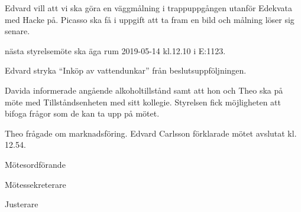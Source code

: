 \documentclass[10pt]{article}
\def\mo{Edvard Carlsson}
\def\ms{Sonja Kenari}
\def\ji{Jakob Pettersson}
\begin{document}
\begin{paragrafer}
Edvard vill att vi ska göra en väggmålning i trappuppgången utanför Edekvata med Hacke på. Picasso ska få i uppgift att ta fram en bild och målning löser sig senare.

\Mba nästa styrelsemöte ska äga rum 2019-05-14 kl.12.10 i E:1123.


Edvard \ypa stryka ``Inköp av vattendunkar'' från beslutsuppföljningen.
\Mbaby

Davida informerade angående alkoholtillstånd samt att hon och Theo ska på möte med Tillståndsenheten med sitt kollegie. Styrelsen fick möjligheten att bifoga frågor som de kan ta upp på mötet.

Theo frågade om marknadsföring. 
{\mo} förklarade mötet avslutat kl. 12.54.
\end{paragrafer}

\hidesignfoot
\begin{signatures}{3}
\signature{\mo}{Mötesordförande}
\signature{\ms}{Mötessekreterare}
\signature{\ji}{Justerare}
\end{signatures}
\end{document}
